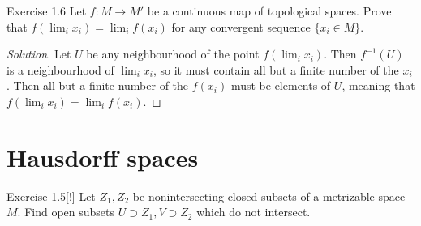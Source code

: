 \begin{thing4}{Exercise 1.6}\label{exer:1.6}\leavevmode
Let \(f:M \to M'\) be a continuous map of topological spaces. Prove that \(f\left( \lim_{i} x_i \right) =\lim_{i} f(x_i)\) for any convergent sequence \(\{x_i \in M\}\).
\end{thing4}

\begin{proof}[Solution]\leavevmode
Let \(U\) be any neighbourhood of the point \(f\left( \lim_{i} x_i \right) \). Then \(f^{-1}(U)\) is a neighbourhood of \(\lim_{i} x_i\), so it must contain all but a finite number of the \(x_i\). Then all but a finite number of the \(f(x_i)\) must be elements of \(U\), meaning that \(f\left( \lim_{i} x_i \right) =\lim_{i} f(x_i)\).
\end{proof}

\section{Hausdorff spaces}

\begin{thing4}{Exercise 1.5}[!]\label{exer:1.5}\leavevmode
	Let $Z_1,Z_2$ be nonintersecting closed subsets of a metrizable space $M$. Find open subsets $U \supset Z_1, V \supset Z_2$ which do not intersect.
\end{thing4}

